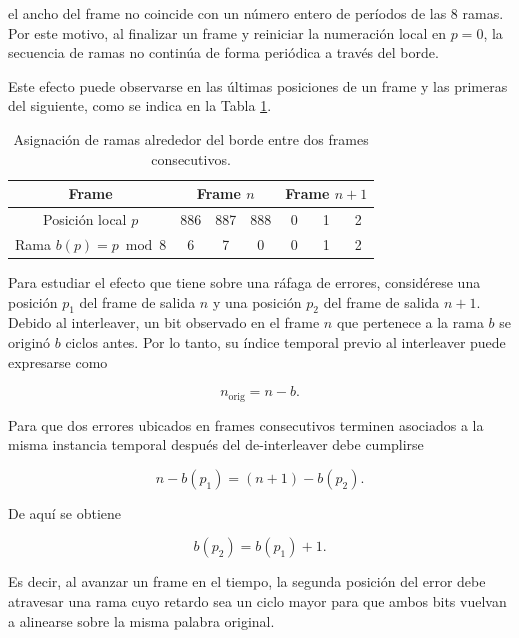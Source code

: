 \documentclass[10pt,a4paper]{article}
\begin{document}
el ancho del frame no coincide con un número entero de períodos de las 8
ramas. Por este motivo, al finalizar un frame y reiniciar la numeración local
en $p=0$, la secuencia de ramas no continúa de forma periódica a través del
borde.

Este efecto puede observarse en las últimas posiciones de un frame y las
primeras del siguiente, como se indica en la Tabla \ref{tab:borde-frames}.

\begin{table}[H]
\centering
\begin{tabular}{c|ccc|ccc}
\textbf{Frame} & \multicolumn{3}{c|}{\textbf{Frame $n$}}
               & \multicolumn{3}{c}{\textbf{Frame $n+1$}} \\
\hline
Posición local $p$ & 886 & 887 & 888 & 0 & 1 & 2 \\
\hline
Rama $b(p)=p\bmod 8$ & 6 & 7 & 0 & 0 & 1 & 2
\end{tabular}
\caption{Asignación de ramas alrededor del borde entre dos frames consecutivos.}
\label{tab:borde-frames}
\end{table}

Para estudiar el efecto que tiene sobre una ráfaga de errores, considérese una 
posición $p_1$ del frame de salida $n$ y una posición $p_2$ del frame de salida 
$n+1$. Debido al interleaver, un bit observado en el frame $n$ que pertenece a 
la rama $b$ se originó $b$ ciclos antes. Por lo tanto, su índice temporal previo 
al interleaver puede expresarse como

\begin{equation}
    n_{\mathrm{orig}}=n-b.
    \label{eq:frame-original}
\end{equation}

Para que dos errores ubicados en frames consecutivos terminen asociados a la
misma instancia temporal después del de-interleaver debe cumplirse

\begin{equation}
    n-b(p_1)
    =
    (n+1)-b(p_2).
\end{equation}

De aquí se obtiene

\begin{equation}
    b(p_2)=b(p_1)+1.
    \label{eq:rama-borde}
\end{equation}

Es decir, al avanzar un frame en el tiempo, la segunda posición del error debe
atravesar una rama cuyo retardo sea un ciclo mayor para que ambos bits vuelvan
a alinearse sobre la misma palabra original.
\end{document}

